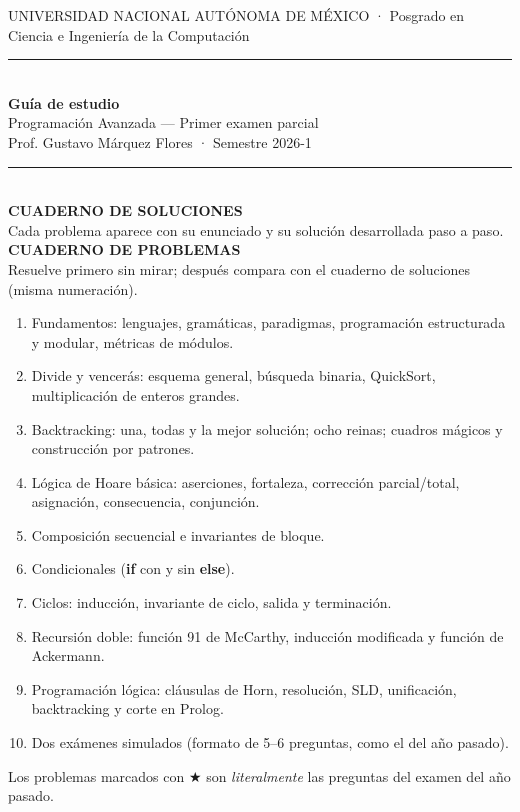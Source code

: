 \thispagestyle{empty}
\begin{center}
{\small UNIVERSIDAD NACIONAL AUTÓNOMA DE MÉXICO · Posgrado en Ciencia e Ingeniería de la Computación}\\[1.2cm]
{\color{azul}\rule{\linewidth}{1pt}}\\[0.4cm]
{\Huge\bfseries\color{azul} Guía de estudio}\\[0.3cm]
{\LARGE Programación Avanzada — Primer examen parcial}\\[0.3cm]
{\large Prof. Gustavo Márquez Flores · Semestre 2026-1}\\[0.4cm]
{\color{azul}\rule{\linewidth}{1pt}}\\[0.8cm]
\ifsol
{\Large\bfseries\color{verde} CUADERNO DE SOLUCIONES}\\[0.2cm]
{\normalsize Cada problema aparece con su enunciado y su solución desarrollada paso a paso.}
\else
{\Large\bfseries\color{azul} CUADERNO DE PROBLEMAS}\\[0.2cm]
{\normalsize Resuelve primero sin mirar; después compara con el cuaderno de soluciones (misma numeración).}
\fi
\end{center}
\vspace{0.8cm}

\begin{formulario}[Contenido]
\begin{enumerate}[label=\textbf{\arabic*.},leftmargin=*]
\item Fundamentos: lenguajes, gramáticas, paradigmas, programación estructurada y modular, métricas de módulos.
\item Divide y vencerás: esquema general, búsqueda binaria, QuickSort, multiplicación de enteros grandes.
\item Backtracking: una, todas y la mejor solución; ocho reinas; cuadros mágicos y construcción por patrones.
\item Lógica de Hoare básica: aserciones, fortaleza, corrección parcial/total, asignación, consecuencia, conjunción.
\item Composición secuencial e invariantes de bloque.
\item Condicionales (\textbf{if} con y sin \textbf{else}).
\item Ciclos: inducción, invariante de ciclo, salida y terminación.
\item Recursión doble: función 91 de McCarthy, inducción modificada y función de Ackermann.
\item Programación lógica: cláusulas de Horn, resolución, SLD, unificación, backtracking y corte en Prolog.
\item Dos exámenes simulados (formato de 5--6 preguntas, como el del año pasado).
\end{enumerate}
Los problemas marcados con $\bigstar$ son \emph{literalmente} las preguntas del examen del año pasado.
\end{formulario}

